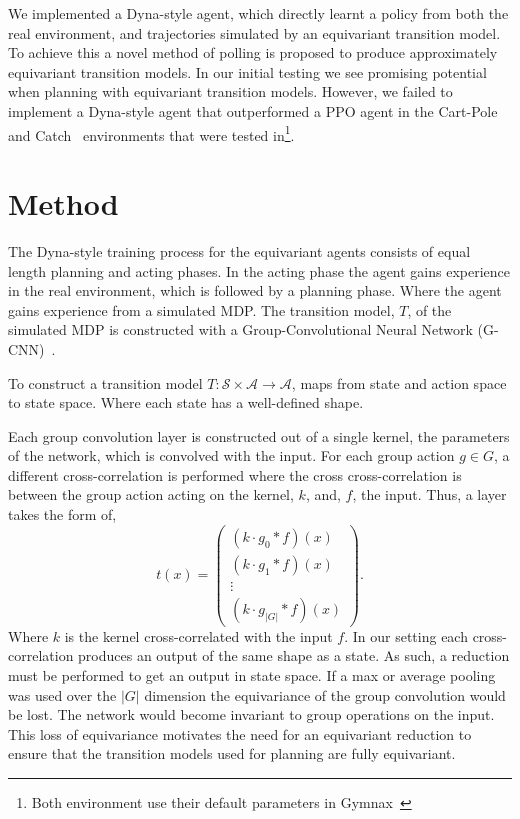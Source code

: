 \documentclass[mlabstract]{jmlr}
\begin{document}
We implemented a Dyna-style agent, which directly learnt a policy from both the real environment, and trajectories simulated by an equivariant transition model. To achieve this a novel method of polling is proposed to produce approximately equivariant transition models. In our initial testing we see promising potential when planning with equivariant transition models. However, we failed to implement a Dyna-style agent that outperformed a PPO agent in the Cart-Pole\cite{florian2007correct, barto1983neuronlike} and Catch~\cite{osband2020bsuite} environments that were tested in\footnote{Both environment use their default parameters in Gymnax~\cite{lu2022discovered}}.

\section{Method}
The Dyna-style training process for the equivariant agents consists of equal length planning and acting phases. In the acting phase the agent gains experience in the real environment, which is followed by a planning phase. Where the agent gains experience from a simulated MDP. The transition model, $T$, of the simulated MDP is constructed with a Group-Convolutional Neural Network (G-CNN)~\cite{cohen2016group}.

To construct a transition model $T: \mathcal{S} \times \mathcal{A} \rightarrow \mathcal{A}$, maps from state and action space to state space. Where each state has a well-defined shape.

Each group convolution layer is constructed out of a single kernel, the parameters of the network, which is convolved with the input. For each group action $g \in G$, a different cross-correlation is performed where the cross cross-correlation is between the group action acting on the kernel, $k$, and, $f$, the input. Thus, a layer takes the form of,
\begin{equation}
	t(x) = \begin{pmatrix}
		(k \cdot g_0* f )(x)  \\
		(k \cdot g_1 * f )(x) \\
		\vdots                \\
		(k \cdot g_{|G|} * f)(x)
	\end{pmatrix}.
	\label{eq:g-cnn}
\end{equation}
Where $k$ is the kernel cross-correlated with the input $f$. In our setting each cross-correlation produces an output of the same shape as a state. As such, a reduction must be performed to get an output in state space. If a max or average pooling was used over the $|G|$ dimension the equivariance of the group convolution would be lost. The network would become invariant to group operations on the input. This loss of equivariance motivates the need for an equivariant reduction to ensure that the transition models used for planning are fully equivariant.
\end{document}
